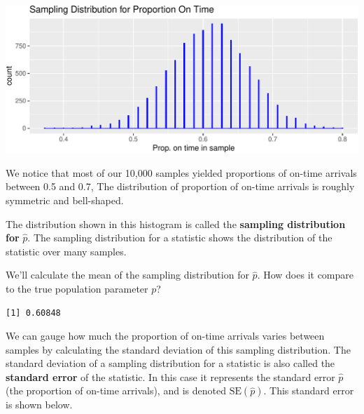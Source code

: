 \documentclass[
  letterpaper,
  DIV=11,
  numbers=noendperiod]{scrreprt}
\newenvironment{Shaded}{\begin{snugshade}}{\end{snugshade}}
\newcommand{\FunctionTok}[1]{\textcolor[rgb]{0.28,0.35,0.67}{#1}}
\newcommand{\NormalTok}[1]{\textcolor[rgb]{0.00,0.23,0.31}{#1}}
\newcommand{\OtherTok}[1]{\textcolor[rgb]{0.00,0.23,0.31}{#1}}
\newcommand{\SpecialCharTok}[1]{\textcolor[rgb]{0.37,0.37,0.37}{#1}}
\begin{document}
\includegraphics{Ch3_files/figure-pdf/unnamed-chunk-19-1.pdf}

We notice that most of our 10,000 samples yielded proportions of on-time
arrivals between 0.5 and 0.7, The distribution of proportion of on-time
arrivals is roughly symmetric and bell-shaped.

The distribution shown in this histogram is called the \textbf{sampling
distribution for} \(\hat{p}\). The sampling distribution for a statistic
shows the distribution of the statistic over many samples.

We'll calculate the mean of the sampling distribution for \(\hat{p}\).
How does it compare to the true population parameter \(p\)?

\begin{Shaded}
\end{Shaded}

\begin{verbatim}
[1] 0.60848
\end{verbatim}

We can gauge how much the proportion of on-time arrivals varies between
samples by calculating the standard deviation of this sampling
distribution. The standard deviation of a sampling distribution for a
statistic is also called the \textbf{standard error} of the statistic.
In this case it represents the standard error \(\hat{p}\) (the
proportion of on-time arrivals), and is denoted \(\text{SE}(\hat{p})\).
This standard error is shown below.

\begin{Shaded}
\end{Shaded}
\end{document}
